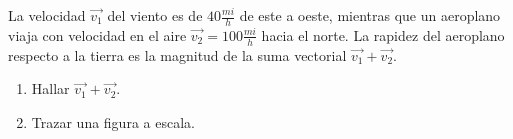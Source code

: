 La velocidad $\vec{v_1}$ del viento es de $ 40 \frac{mi}{h} $ de este a oeste, mientras que un aeroplano viaja con velocidad en el aire $ \vec{v_2} = 100 \frac{mi}{h} $ hacia el norte. La rapidez del aeroplano respecto a la tierra es la magnitud de la suma vectorial $\vec{v_1} + \vec{v_2}$.
\begin{enumerate}
    \item Hallar $\vec{v_1} + \vec{v_2}$.
    \item Trazar una figura a escala.
\end{enumerate}